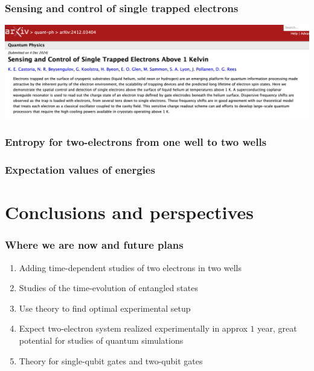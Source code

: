 \documentclass{beamer}
\begin{document}
\begin{frame}
\frametitle{Sensing and control of single trapped electrons}
\centerline{\includegraphics[width=1.2\linewidth]{qcfigures/sensing.png}}
\end{frame}


\begin{frame}
\frametitle{Entropy for two-electrons from one well to two wells}
\end{frame}


\begin{frame}
\frametitle{Expectation values of energies}
\end{frame}




\section{Conclusions and perspectives}

\begin{frame}
\frametitle{Where we are now and future plans}

\begin{enumerate}
\item Adding time-dependent studies of two electrons in two wells

\item Studies of the time-evolution of entangled states

\item Use theory to find optimal experimental setup

\item Expect two-electron system realized experimentally in approx $1$ year, great potential for studies of quantum simulations

\item Theory for single-qubit gates and two-qubit gates  
\end{enumerate}

\noindent
\end{frame}
\end{document}
